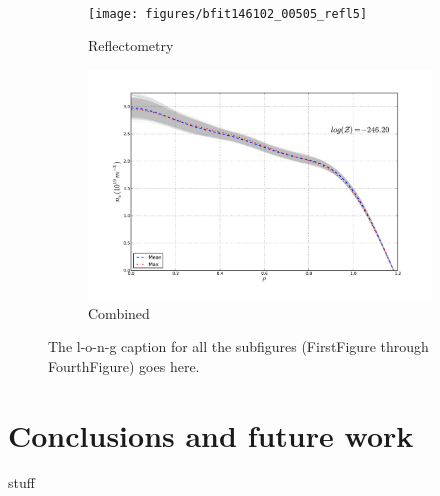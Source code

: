 \documentclass	[12pt]{article}
\begin{document}
\begin{figure}[h!]
\begin{subfigure}[b]{0.5\textwidth}
		\label{fig:inter505}
	\end{subfigure} \\%
	\begin{subfigure}[b]{0.5\textwidth}
		\centering
		\texttt{[image: figures/bfit146102\_00505\_refl5]}
		\vspace{-30pt}
		\caption{Reflectometry}
		\label{fig:refl505}
	\end{subfigure}
	\hspace{-20pt}
	\begin{subfigure}[b]{0.5\textwidth}
		\centering
		\includegraphics[width=\textwidth,keepaspectratio=true]{figures/bfit146102_00505_all5}
		\vspace{-30pt}
		\caption{Combined}
		\label{fig:all505}
	\end{subfigure}
	\caption{The l-o-n-g caption for all the subfigures (FirstFigure through FourthFigure) goes here.}
	\label{fig:dne505}
\end{figure}
\section{Conclusions and future work}
stuff



\end{document}
